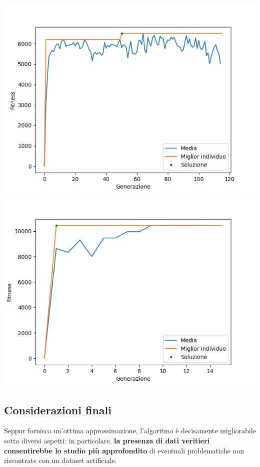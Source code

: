 \documentclass{CSUniSchoolLabReport}
\begin{document}
\begin{center}
	\includegraphics[scale=0.25]{results/18}
	\includegraphics[scale=0.25]{results/19}
	
\end{center}

\pagebreak{}

\subsection{Considerazioni finali}

Seppur fornisca un'ottima approssimazione, l'algoritmo è decisamente migliorabile sotto diversi aspetti: in particolare, \textbf{la presenza di dati veritieri consentirebbe lo studio più approfondito} di eventuali problematiche non riscontrate con un dataset artificiale.
\end{document}
